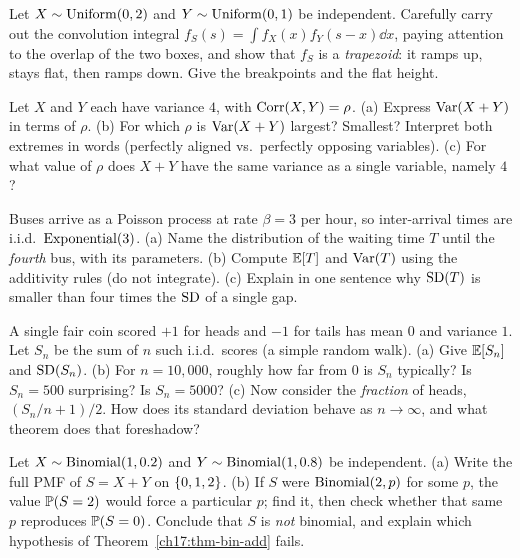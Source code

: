\begin{exercise}
\label{ch17:ex-unif}
Let $X\sim\Unif(0,2)$ and $Y\sim\Unif(0,1)$ be independent. Carefully
carry out the convolution integral
$f_S(s)=\int f_X(x)f_Y(s-x)\dd x$, paying attention to the overlap of the
two boxes, and show that $f_S$ is a \emph{trapezoid}: it ramps up, stays
flat, then ramps down. Give the breakpoints and the flat height.
\end{exercise}

\begin{exercise}
\label{ch17:ex-cov}
Let $X$ and $Y$ each have variance $4$, with $\Corr(X,Y)=\rho$.
(a) Express $\Var(X+Y)$ in terms of $\rho$.
(b) For which $\rho$ is $\Var(X+Y)$ largest? Smallest? Interpret both
extremes in words (perfectly aligned vs.\ perfectly opposing variables).
(c) For what value of $\rho$ does $X+Y$ have the same variance as a single
variable, namely $4$?
\end{exercise}

\begin{exercise}
\label{ch17:ex-erlang}
Buses arrive as a Poisson process at rate $\beta=3$ per hour, so
inter-arrival times are i.i.d.\ $\Expo(3)$.
(a) Name the distribution of the waiting time $T$ until the \emph{fourth}
bus, with its parameters.
(b) Compute $\E[T]$ and $\Var(T)$ using the additivity rules (do not
integrate).
(c) Explain in one sentence why $\SD(T)$ is smaller than four times the
$\SD$ of a single gap.
\end{exercise}

\begin{exercise}
\label{ch17:ex-sqrtn}
A single fair coin scored $+1$ for heads and $-1$ for tails has mean $0$
and variance $1$. Let $S_n$ be the sum of $n$ such i.i.d.\ scores (a simple
random walk).
(a) Give $\E[S_n]$ and $\SD(S_n)$.
(b) For $n=10{,}000$, roughly how far from $0$ is $S_n$ typically? Is
$S_n=500$ surprising? Is $S_n=5000$?
(c) Now consider the \emph{fraction} of heads, $(S_n/n + 1)/2$. How does
its standard deviation behave as $n\to\infty$, and what theorem does that
foreshadow?
\end{exercise}

\begin{exercise}
\label{ch17:ex-difp}
Let $X\sim\Bin(1,0.2)$ and $Y\sim\Bin(1,0.8)$ be independent.
(a) Write the full PMF of $S=X+Y$ on $\set{0,1,2}$.
(b) If $S$ were $\Bin(2,p)$ for some $p$, the value $\P(S=2)$ would force a
particular $p$; find it, then check whether that same $p$ reproduces
$\P(S=0)$. Conclude that $S$ is \emph{not} binomial, and explain which
hypothesis of Theorem~\ref{ch17:thm-bin-add} fails.
\end{exercise}

